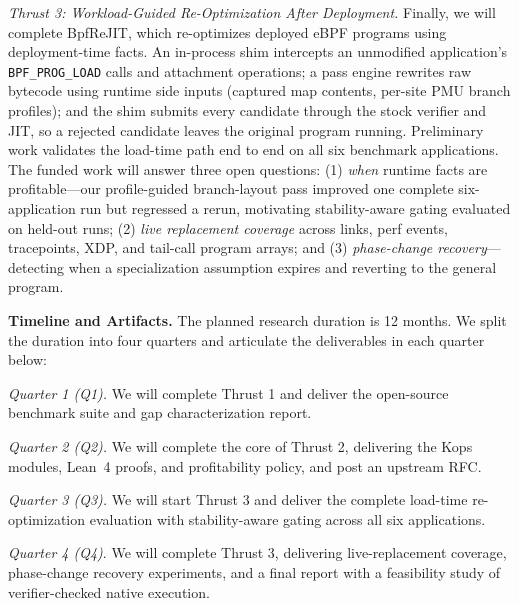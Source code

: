 \textit{Thrust 3: Workload-Guided Re-Optimization After Deployment.}
Finally, we will complete BpfReJIT, which re-optimizes deployed eBPF programs using deployment-time facts.  An in-process shim intercepts an unmodified application's \texttt{BPF\_PROG\_LOAD} calls and attachment operations; a pass engine rewrites raw bytecode using runtime side inputs (captured map contents, per-site PMU branch profiles); and the shim submits every candidate through the stock verifier and JIT, so a rejected candidate leaves the original program running.  Preliminary work validates the load-time path end to end on all six benchmark applications.  The funded work will answer three open questions: (1) \textit{when} runtime facts are profitable---our profile-guided branch-layout pass improved one complete six-application run but regressed a rerun, motivating stability-aware gating evaluated on held-out runs; (2) \textit{live replacement coverage} across links, perf events, tracepoints, XDP, and tail-call program arrays; and (3) \textit{phase-change recovery}---detecting when a specialization assumption expires and reverting to the general program.

\noindent \textbf{Timeline and Artifacts.} The planned research duration is 12 months.  We split the duration into four quarters and articulate the deliverables in each quarter below:

\textit{Quarter 1 (Q1).} We will complete Thrust 1 and deliver the open-source benchmark suite and gap characterization report.

\textit{Quarter 2 (Q2).} We will complete the core of Thrust 2, delivering the Kops modules, Lean~4 proofs, and profitability policy, and post an upstream RFC.

\textit{Quarter 3 (Q3).} We will start Thrust 3 and deliver the complete load-time re-optimization evaluation with stability-aware gating across all six applications.

\textit{Quarter 4 (Q4)}. We will complete Thrust 3, delivering live-replacement coverage, phase-change recovery experiments, and a final report with a feasibility study of verifier-checked native execution.

